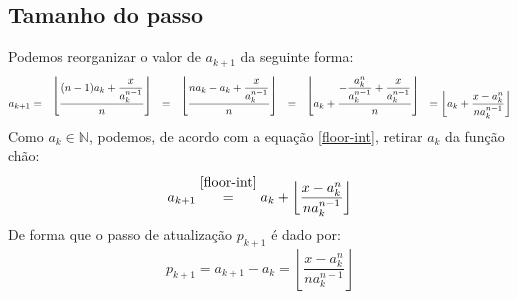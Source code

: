 \subsection*{Tamanho do passo}

Podemos reorganizar o valor de $a_{k+1}$ da seguinte forma:
\[
  a_{k+1}
  = \bracketize[.75em]{\lfloor}{\rfloor}{
      \dfrac{(n-1) a_k + \dfrac{x}{a_k^{n-1}}}{n}
    }
  = \bracketize[.75em]{\lfloor}{\rfloor}{
      \dfrac{n a_k - a_k + \dfrac{x}{a_k^{n-1}}}{n}
    }
  = \bracketize[.75em]{\lfloor}{\rfloor}{
      a_k +
      \dfrac{- \dfrac{a_k^n}{a_k^{n-1}} + \dfrac{x}{a_k^{n-1}}}
            {n}
    }
  = \left\lfloor
      a_k +
      \dfrac{x - a_k^n}{na_k^{n-1}}
    \right\rfloor
\]
Como $a_k \in \mathds{N}$, podemos,
de acordo com a equação \eqref{floor-int},
retirar $a_k$ da função chão:
\[
    a_{k+1}
  \stackfirst{\eqref{floor-int}}{=}
    a_k +
    \left\lfloor
      \dfrac{x - a_k^n}{na_k^{n-1}}
    \right\rfloor
\]
De forma que o passo de atualização $p_{k+1}$ é dado por:
\begin{equation}
  p_{k+1}
  = a_{k+1} - a_{k}
  = \left\lfloor \dfrac{x - a_k^n}{na_k^{n-1}} \right\rfloor
\end{equation}
